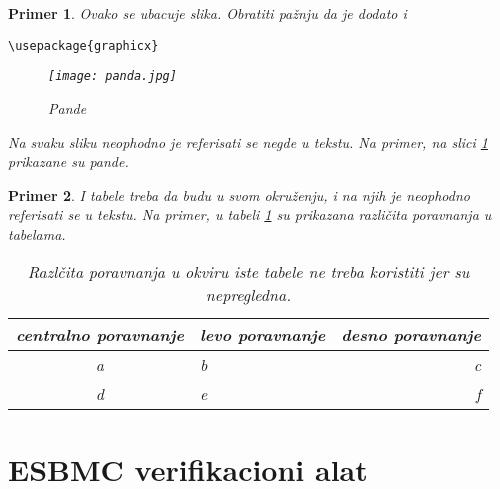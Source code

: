 \documentclass[a4paper]{article}
\newtheorem{primer}{Primer}[section]
\begin{document}
\begin{primer} Ovako se ubacuje slika. Obratiti pažnju da je dodato i 
\begin{verbatim}
\usepackage{graphicx}
\end{verbatim}

\begin{figure}[h!]
\begin{center}
\texttt{[image: panda.jpg]}
\end{center}
\caption{Pande}
\label{fig:pande}
\end{figure}

Na svaku sliku neophodno je referisati se negde u tekstu. Na primer, na slici \ref{fig:pande} prikazane su pande. 
\end{primer}

\begin{primer} I tabele treba da budu u svom okruženju, i na njih je neophodno referisati se u tekstu. Na primer, u tabeli \ref{tab:tabela1} su prikazana različita poravnanja u tabelama.

\begin{table}[h!]
\begin{center}
\caption{Razlčita poravnanja u okviru iste tabele ne treba koristiti jer su nepregledna.}
\begin{tabular}{|c|l|r|} \hline
centralno poravnanje& levo poravnanje& desno poravnanje\\ \hline
a &b&c\\ \hline
d &e&f\\ \hline
\end{tabular}
\label{tab:tabela1}
\end{center}
\end{table}

\end{primer}





\section{ESBMC verifikacioni alat}
\label{sec:ESBMC}
\end{document}
